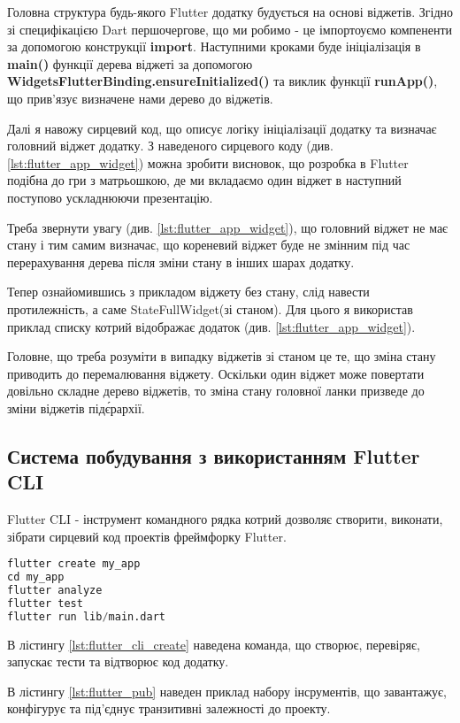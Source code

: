 Головна структура будь-якого Flutter додатку будується на основі віджетів.
Згідно зі специфікацією Dart першочергове, що ми робимо - це імпортоуємо компененти за допомогою конструкції \textbf{import}.
Наступними кроками буде ініціалізація в \textbf{main()} функції дерева віджеті
за допомогою \textbf{WidgetsFlutterBinding.ensureInitialized()} та
виклик функції \textbf{runApp()}, що прив'язує визначене нами дерево до віджетів.

Далі я навожу сирцевий код, що описує логіку ініціалізації додатку та визначає головний віджет додатку.
З наведеного сирцевого коду (див. \ref{lst:flutter_app_widget}) можна зробити висновок,
що розробка в Flutter подібна до гри з матрьошкою, де ми вкладаємо один віджет в наступний поступово
ускладнюючи презентацію.

Треба звернути увагу (див. \ref{lst:flutter_app_widget}),
що головний віджет не має стану і тим самим визначає, що кореневий віджет буде не змінним
під час перерахування дерева після зміни стану в інших шарах додатку.

Тепер ознайомившись з прикладом віджету без стану, слід навести протилежність, а саме StateFullWidget(зі станом).
Для цього я використав приклад списку котрий відображає додаток (див. \ref{lst:flutter_app_widget}).

Головне, що треба розуміти в випадку віджетів зі станом це те, що зміна стану приводить до перемалювання віджету.
Оскільки один віджет може повертати довільно складне дерево віджетів, то зміна стану головної ланки призведе до зміни віджетів під\'єрархії.

\subsection{Система побудування з використанням Flutter CLI}
\label{subsec:flutter_cli_theory}
Flutter CLI - інструмент командного рядка котрий дозволяє створити, виконати, зібрати сирцевий код проектів фреймфорку Flutter.

\begin{lstlisting}[style=light, language=Python,label={lst:flutter_cli_create},caption=Flutter Create Project]
flutter create my_app
cd my_app
flutter analyze
flutter test
flutter run lib/main.dart
\end{lstlisting}

В лістингу \ref{lst:flutter_cli_create} наведена команда, що створює, перевіряє, запускає тести та відтворює код додатку.

В лістингу \ref{lst:flutter_pub} наведен приклад набору інсрументів,
що завантажує, конфігурує та під'єднує транзитивні залежності до проекту.

